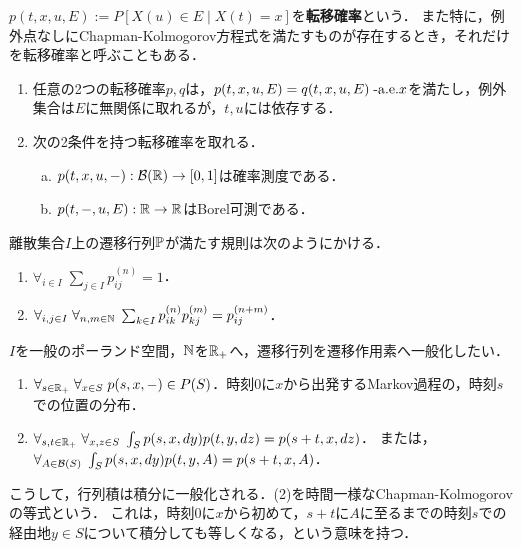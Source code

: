 \documentclass[uplatex,dvipdfmx]{jsreport}
\begin{document}
\begin{definition}
    $p(t,x,u,E):=P[X(u)\in E\mid X(t)=x]$を\textbf{転移確率}という．
    また特に，例外点なしにChapman-Kolmogorov方程式を満たすものが存在するとき，それだけを転移確率と呼ぶこともある．
\end{definition}

\begin{lemma}\mbox{}
    \begin{enumerate}
        \item 任意の2つの転移確率$p,q$は，$p(t,x,u,E)=q(t,x,u,E)\;\text{-a.e.} x$を満たし，例外集合は$E$に無関係に取れるが，$t,u$には依存する．
        \item
    次の2条件を持つ転移確率を取れる．
    \begin{enumerate}[(a)]
        \item $p(t,x,u,-):\mathcal{B}(\mathbb{R})\to[0,1]$は確率測度である．
        \item $p(t,-,u,E):\mathbb{R}\to\mathbb{R}$はBorel可測である．
    \end{enumerate}
    \end{enumerate}
\end{lemma}

\begin{discussion}
    離散集合$I$上の遷移行列$\mathbb{P}$が満たす規則は次のようにかける．
    \begin{enumerate}
        \item $\forall_{i\in I}\;\sum_{j\in I}p_{ij}^{(n)}=1$．
        \item $\forall_{i,j\in I}\;\forall_{n,m\in\mathbb{N}}\;\sum_{k\in I}p_{ik}^{(n)}p_{kj}^{(m)}=p_{ij}^{(n+m)}$．
    \end{enumerate}
    $I$を一般のポーランド空間，$\mathbb{N}$を$\mathbb{R}_+$へ，遷移行列を遷移作用素へ一般化したい．
    \begin{enumerate}
        \item $\forall_{s\in\mathbb{R}_+}\;\forall_{x\in S}\;p(s,x,-)\in P(S)$．時刻$0$に$x$から出発するMarkov過程の，時刻$s$での位置の分布．
        \item $\forall_{s,t\in\mathbb{R}_+}\;\forall_{x,z\in S}\;\int_Sp(s,x,dy)p(t,y,dz)=p(s+t,x,dz)$．
        または，$\forall_{A\in\mathcal{B}(S)}\;\int_Sp(s,x,dy)p(t,y,A)=p(s+t,x,A)$．
    \end{enumerate}
    こうして，行列積は積分に一般化される．(2)を時間一様なChapman-Kolmogorovの等式という．
    これは，時刻$0$に$x$から初めて，$s+t$に$A$に至るまでの時刻$s$での経由地$y\in S$について積分しても等しくなる，という意味を持つ．
\end{discussion}
\end{document}
